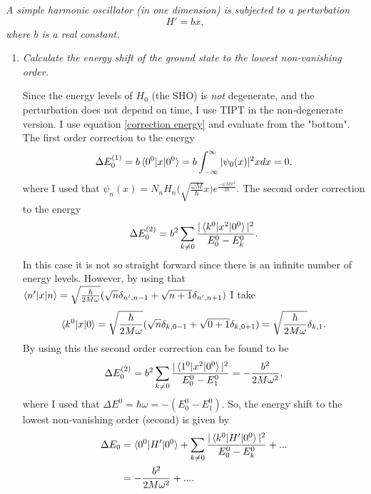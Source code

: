 \begin{example}
	\emph{A simple harmonic oscillator (in one dimension) is subjected to a perturbation}
	\begin{equation}
		H'=bx,
	\end{equation}  
	\emph{where $b$ is a real constant.}\newline
	
	\begin{enumerate}
		\item \emph{Calculate the energy shift of the ground state to the lowest non-vanishing order.}\newline
		
		Since the energy levels of $H_0$ (the SHO) is \emph{not} degenerate, and the perturbation does not depend on time, I use TIPT in the non-degenerate version. I use equation \eqref{correction energy} and evaluate from the "bottom". The first order correction to the energy
		\begin{equation}
			\Delta E^{(1)}_0=b\braket{0^0|x|0^0}=b\int_{-\infty}^{\infty}|\psi_0(x)|^2xdx=0,
		\end{equation} 
		where I used that $\psi_n(x)=N_nH_n\big(\sqrt{\frac{\omega M}{\hbar}}x\big)e^{\frac{-\omega M x^2}{2\hbar}}$. The second order correction to the energy
		\begin{equation}
			\Delta E_0^{(2)}=b^2\sum_{k\neq 0}\frac{|\braket{k^0|x^2|0^0}|^2}{E_0^0-E_k^0}.
		\end{equation} 
		In this case it is not so straight forward since there is an infinite number of energy levels. However, by using that $\braket{n'|x|n}=\sqrt{\frac{\hbar}{2M\omega}}(\sqrt{n}\delta_{n',n-1}+\sqrt{n+1}\delta_{n',n+1})$ I take
		\begin{equation}
			\braket{k^0|x|0}=\sqrt{\frac{\hbar}{2M\omega}}(\sqrt{n}\delta_{k,0-1}+\sqrt{0+1}\delta_{k,0+1})=\sqrt{\frac{\hbar}{2M\omega}}\delta_{k,1}.
		\end{equation} 
		By using this the second order correction can be found to be
		\begin{equation}
			\Delta E_0^{(2)}=b^2\sum_{k\neq 0}\frac{|\braket{1^0|x^2|0^0}|^2}{E_0^0-E_1^0}=-\frac{b^2}{2M\omega^2},
		\end{equation} 
		where I used that $\Delta E^0=\hbar\omega=-(E_0^0-E_1^0)$. So, the energy shift to the lowest non-vanishing order (second) is given by
		\begin{equation}
			\begin{split}
				\Delta E_0&= \braket{0^0|H'|0^0}+\sum_{k\neq 0}\frac{|\braket{k^0|H'|0^0}|^2}{E_0^0-E_k^0}+...\\&=-\frac{b^2}{2M\omega^2}+....
			\end{split}
		\end{equation} 
		

\end{enumerate}
\end{example}
